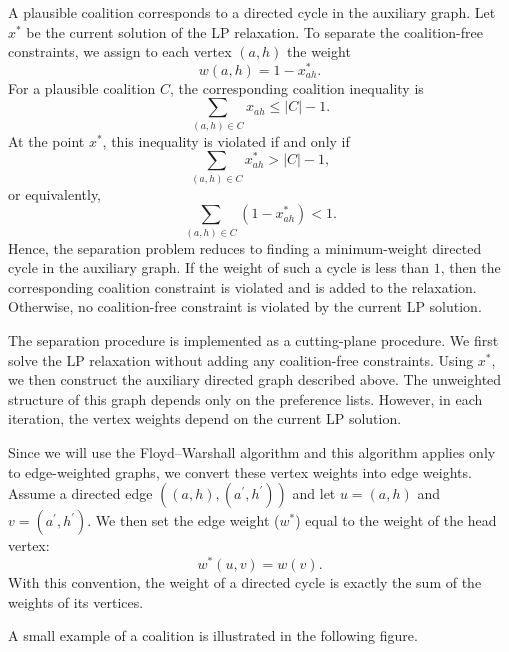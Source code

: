 \documentclass[12pt]{report}
\numberwithin{algorithm}{chapter}
\begin{document}
	A plausible coalition corresponds to a directed cycle in the auxiliary graph. Let $x^*$ be the current solution of the LP relaxation. To separate the coalition-free constraints, we assign to each vertex $(a,h)$ the weight
	\[
	w(a,h)=1-x^*_{ah}.
	\]
	For a plausible coalition $C$, the corresponding coalition inequality is
	\[
	\sum_{(a,h)\in C} x_{ah}\leq |C|-1.
	\]
	At the point $x^*$, this inequality is violated if and only if
	\[
	\sum_{(a,h)\in C} x^*_{ah}>|C|-1,
	\]
	or equivalently,
	\begin{equation}\label{cycle-condition}
		\sum_{(a,h)\in C} (1-x^*_{ah})<1.
	\end{equation}
	Hence, the separation problem reduces to finding a minimum-weight directed cycle in the auxiliary graph. If the weight of such a cycle is less than $1$, then the corresponding coalition constraint is violated and is added to the relaxation. Otherwise, no coalition-free constraint is violated by the current LP solution.
	
	The separation procedure is implemented as a cutting-plane procedure. We first solve the LP relaxation without adding any coalition-free constraints. Using $x^*$, we then construct the auxiliary directed graph described above. The unweighted structure of this graph depends only on the preference lists. However, in each iteration, the vertex weights depend on the current LP solution.
	
	Since we will use the Floyd--Warshall algorithm \cite{floyd1962algorithm} and this algorithm applies only to edge-weighted graphs, we convert these vertex weights into edge weights. Assume a directed edge $((a, h), (a^{'},h^{'}))$ and let $u = (a, h)$ and $v = (a^{'},h^{'})$.
	We then set the edge weight ($w^{*}$) equal to the weight of the head vertex:
	\[
	w^{*}(u, v) = w(v).
	\]
	With this convention, the weight of a directed cycle is exactly the sum of the weights of its vertices.
	
	A small example of a coalition is illustrated in the following figure.
	
\end{document}
